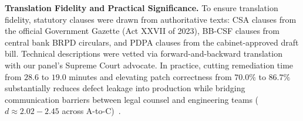 \noindent\textbf{Translation Fidelity and Practical Significance.}\label{sec:usable:translation} To ensure translation fidelity, statutory clauses were drawn from authoritative texts: CSA clauses from the official Government Gazette (Act XXVII of 2023), BB-CSF clauses from central bank BRPD circulars, and PDPA clauses from the cabinet-approved draft bill. Technical descriptions were vetted via forward-and-backward translation with our panel's Supreme Court advocate. In practice, cutting remediation time from $28.6$ to $19.0$ minutes and elevating patch correctness from $70.0\%$ to $86.7\%$ substantially reduces defect leakage into production while bridging communication barriers between legal counsel and engineering teams ($d \approx 2.02 - 2.45$ across A-to-C)~\cite{cohen_kappa, wohlin_experimentation}.
